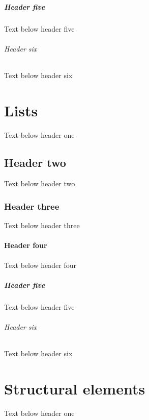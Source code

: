 \documentclass[a4paper,10pt,icelandic]{sphinxmanual}
\begin{document}
\paragraph{Header five}
\label{\detokenize{generic-items/index:header-five}}
\sphinxAtStartPar
Text below header five


\subparagraph{Header six}
\label{\detokenize{generic-items/index:header-six}}
\sphinxAtStartPar
Text below header six

\sphinxstepscope


\chapter{Lists}
\label{\detokenize{lists/index:lists}}\label{\detokenize{lists/index::doc}}
\sphinxAtStartPar
Text below header one


\section{Header two}
\label{\detokenize{lists/index:header-two}}
\sphinxAtStartPar
Text below header two


\subsection{Header three}
\label{\detokenize{lists/index:header-three}}
\sphinxAtStartPar
Text below header three


\subsubsection{Header four}
\label{\detokenize{lists/index:header-four}}
\sphinxAtStartPar
Text below header four


\paragraph{Header five}
\label{\detokenize{lists/index:header-five}}
\sphinxAtStartPar
Text below header five


\subparagraph{Header six}
\label{\detokenize{lists/index:header-six}}
\sphinxAtStartPar
Text below header six

\sphinxstepscope


\chapter{Structural elements}
\label{\detokenize{structural-elements/index:structural-elements}}\label{\detokenize{structural-elements/index::doc}}
\sphinxAtStartPar
Text below header one
\end{document}

